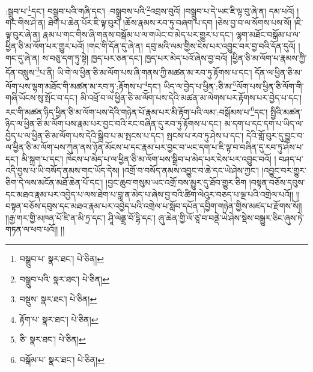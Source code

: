 :སྒྲུབ་པ་\footnote{བསྒྲུབ་པ་  སྣར་ཐང་།  པེ་ཅིན། }དང་། བསྒྲུབ་པའི་གཞི་དང་། :བསྒྲུབས་པའི་\footnote{བསྒྲུབ་པའི་  སྣར་ཐང་།  པེ་ཅིན། }འབྲས་བུའོ། །བསྒྲུབ་པ་དེ་ཡང་ཇི་ལྟ་བུ་ཞེ་ན། དམ་པའོ། །གང་གིས་ཤེ་ན། ཐེག་པ་ཆེན་པོར་ཇི་ལྟ་བུར། །ཆོས་རྣམས་རབ་ཏུ་བཞག་པ་དག །ཅེས་བྱ་བ་ལ་སོགས་པས་སོ། །ཇི་ལྟ་བུར་ཞེ་ན། རྣམ་པ་གང་གིས་ཞི་གནས་བསྒོམ་པ་ལ་གཡེང་བ་མེད་པར་གྱུར་པ་དང་། ལྷག་མཐོང་བསྒོམ་པ་ལ་ཕྱིན་ཅི་མ་ལོག་པར་གྱུར་པའོ། །གང་གི་དོན་དུ་ཞེ་ན། དབུ་མའི་ལམ་གྱིས་ངེས་པར་འབྱུང་བར་བྱ་བའི་དོན་དུའོ། །གང་དུ་ཞེ་ན། ས་བཅུ་དག་ཏུ་སྟེ། ཁྱད་པར་ཅན་དང་། ཁྱད་པར་མེད་པའོ་ཞེས་བྱ་བའོ། །ཕྱིན་ཅི་མ་ལོག་པ་རྣམས་ཀྱི་དོན་བསླུས་\footnote{བསྡུས་  སྣར་ཐང་།  པེ་ཅིན། }པ་ནི། ཡི་གེ་ལ་ཕྱིན་ཅི་མ་ལོག་པས་ཞི་གནས་ཀྱི་མཚན་མ་རབ་ཏུ་རྟོགས་པ་དང་། དོན་ལ་ཕྱིན་ཅི་མ་ལོག་པས་ལྷག་མཐོང་གི་མཚན་མ་རབ་ཏུ་:རྟོགས་པ་\footnote{རྟོག་པ་  སྣར་ཐང་།  པེ་ཅིན། }དང་། ཡིད་ལ་བྱེད་པ་ཕྱིན་:ཅི་མ་\footnote{ཅི་  སྣར་ཐང་།  པེ་ཅིན། }ལོག་པས་ཕྱིན་ཅི་ལོག་གི་གཞི་ཡོངས་སུ་སྤོང་བ་དང་། མི་འཕྲོ་བ་ལ་ཕྱིན་ཅི་མ་ལོག་པས་དེའི་མཚན་མ་ལེགས་པར་རྟོགས་པར་བྱེད་པ་དང་། རང་གི་མཚན་ཉིད་ཕྱིན་ཅི་མ་ལོག་པས་དེའི་གཉེན་པོ་རྣམ་པར་མི་རྟོག་པའི་ལམ་:བསྒོམས་པ་\footnote{བསྒོམ་པ་  སྣར་ཐང་།  པེ་ཅིན། }དང་། སྤྱིའི་མཚན་ཉིད་ལ་ཕྱིན་ཅི་མ་ལོག་པས་རྣམ་པར་བྱང་བའི་རང་བཞིན་དུ་རབ་ཏུ་རྟོགས་པ་དང་། མ་དག་པ་དང་དག་པ་ཡིད་ལ་བྱེད་པ་ལ་ཕྱིན་ཅི་མ་ལོག་པས་དེའི་སྒྲིབ་པ་མ་སྤངས་པ་དང་། སྤངས་པ་རབ་ཏུ་ཤེས་པ་དང་། དེའི་གློ་བུར་དུ་བྱུང་བ་ལ་ཕྱིན་ཅི་མ་ལོག་པས་ཀུན་ནས་ཉོན་མོངས་པ་དང་རྣམ་པར་བྱང་བ་ཡང་དག་པ་ཇི་ལྟ་བ་བཞིན་དུ་རབ་ཏུ་ཤེས་པ་དང་། མི་སྐྲག་པ་དང་། ཁེངས་པ་མེད་པ་ལ་ཕྱིན་ཅི་མ་ལོག་པས་སྒྲིབ་པ་མེད་པར་ངེས་པར་འབྱུང་བའོ། །
བཤད་པ་འདི་བྱས་པ་ཡི་བསོད་ནམས་གང་ཡོད་དེས། །འགྲོ་བ་བསོད་ནམས་འབྱུང་བ་ཆེ་དང་ཡེ་ཤེས་ཀྱང་། །འབྱུང་བར་གྱུར་ཅིག་དེ་ལས་མངོན་མཐོ་ཆེན་པོ་དང་། །བྱང་ཆུབ་གསུམ་ཡང་འགྲོ་བས་མྱུར་དུ་ཐོབ་གྱུར་ཅིག །བསྟན་བཅོས་དབུས་དང་མཐའ་རྣམ་པར་འབྱེད་པ་ལས་ཐེག་པ་བླ་ན་མེད་པ་ཞེས་བྱ་བའི་ཚིག་ལེའུར་བཅད་པ་ལྔ་པའི་འགྲེལ་པའོ།། །།བསྟན་བཅོས་དབུས་དང་མཐའ་རྣམ་པར་འབྱེད་པའི་འགྲེལ་པ་སློབ་དཔོན་དབྱིག་གཉེན་གྱིས་མཛད་པ་རྫོགས་སོ།། །།རྒྱ་གར་གྱི་མཁན་པོ་ཛི་ན་མི་ཏྲ་དང་། ཤཱི་ལེནྡྲ་བོ་དྷི་དང་། ཞུ་ཆེན་གྱི་ལོ་ཙཱ་བ་བནྡེ་ཡེ་ཤེས་སྡེས་བསྒྱུར་ཅིང་ཞུས་ཏེ་གཏན་ལ་ཕབ་པའོ།། །།